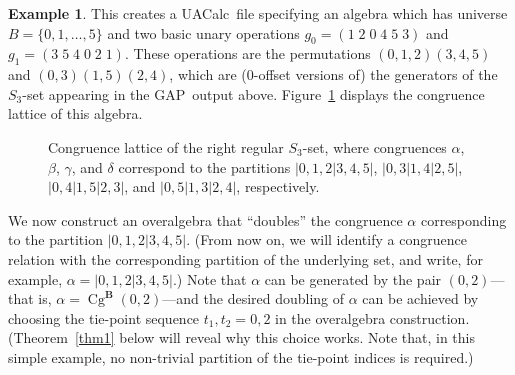 \documentclass{au}
\numberwithin{equation}{section}
\theoremstyle{plain}
\theoremstyle{definition}
\newtheorem{example}[theorem]{Example}
\newcommand{\uacalc}{{\small UAC}alc} %
\newcommand{\<}{\ensuremath{\langle}}
\renewcommand{\>}{\ensuremath{\rangle}}
\newcommand{\bB}{\ensuremath{\mathbf{B}}}
\DeclareMathOperator{\Cg}{Cg}
\newcommand{\GAP}{{\small GAP}} %
\newcommand{\dotsize}{1.0pt}%
\begin{document}
\begin{example}
\noindent %
This creates a \uacalc\ file %
specifying an algebra which has universe $B = \{0, 1, \dots, 5\}$ and two
basic unary operations
$g_0 = (1\;  2 \; 0\;  4\;  5\;  3)$
and $g_1 = (3\;  5\; 4\; 0\;  2\;  1)$.
These operations are the permutations $(0,1,2)(3,4,5)$ and $(0,3)(1,5)(2,4)$,
which are (0-offset versions of) the generators
of the $S_3$-set appearing in the \GAP\ output above.
Figure~\ref{fig:ConS3} displays the congruence lattice of this algebra.

\begin{figure}[h!]
  \centering
  \caption{Congruence lattice of the right regular $S_3$-set, where congruences
    $\alpha$, $\beta$, $\gamma$,
    and $\delta$ correspond to the partitions
        $| 0, 1, 2 | 3, 4, 5|$, $| 0, 3 | 1, 4 | 2, 5 |$, $| 0, 4| 1, 5| 2, 3|$,
        and
    $| 0, 5| 1, 3| 2, 4|$, respectively.
  }
  \label{fig:ConS3}
\end{figure}

We now construct an overalgebra that ``doubles'' the congruence
$\alpha$ corresponding to the partition $| 0, 1, 2 | 3, 4, 5|$. %
(From now on, we will identify a congruence relation with the corresponding
partition of the underlying set, and write, for example, $\alpha = | 0, 1, 2 |
3, 4, 5|$.) 
Note that $\alpha$ can be generated by the pair $(0,2)$---that is, $\alpha =
\Cg^\bB(0,2)$---and
the desired doubling of $\alpha$ can be achieved by
choosing the tie-point sequence $t_1, t_2 = 0, 2$ in the overalgebra
construction.
(Theorem~\ref{thm1} below will reveal why this choice works.  Note that, 
in this simple example, no non-trivial partition of the
  tie-point indices is required.)


\end{example}
\end{document}
